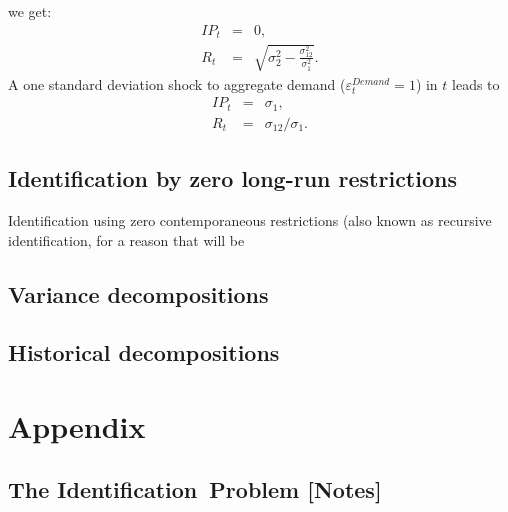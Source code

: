 \documentclass[10pt]{article}
\begin{document}
we get:%
\begin{eqnarray*}
IP_{t} &=&0, \\
R_{t} &=&\sqrt{\sigma _{2}^{2}-\frac{\sigma _{12}^{2}}{\sigma _{1}^{2}}}.
\end{eqnarray*}%
A one standard deviation shock to aggregate demand ($\varepsilon
_{t}^{Demand}=1$) in $t$ leads to%
\begin{eqnarray*}
IP_{t} &=&\sigma _{1}, \\
R_{t} &=&\sigma _{12}/\sigma _{1}.
\end{eqnarray*}

\subsection{Identification by zero long-run restrictions}

Identification using zero contemporaneous restrictions (also known as
recursive identification, for a reason that will be

\subsection{Variance decompositions}

\subsection{Historical decompositions}




\appendix

\section{Appendix}

\subsection{The Identification\ Problem {\color{note} {\protect\small
{[Notes]}}}}
\end{document}
